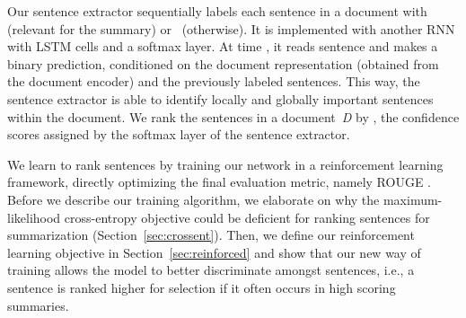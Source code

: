 \documentclass[11pt,a4paper]{article}
\newcommand\doc{{\it D }}
\begin{document}
Our sentence extractor sequentially labels each sentence in a document
with~ (relevant for the summary) or~ (otherwise). It is
implemented with another RNN with LSTM cells and a softmax layer. At
time , it reads sentence  and makes a binary prediction,
conditioned on the document representation (obtained from the document
encoder) and the previously labeled sentences. This way, the sentence
extractor is able to identify locally and globally important sentences
within the document. We rank the sentences in a document~\doc by
\mbox{}, the confidence scores assigned by
the softmax layer of the sentence extractor.








We learn to rank sentences by training our network in a reinforcement
learning framework, directly optimizing the final evaluation metric,
namely ROUGE \cite{rouge}. Before we describe our training algorithm,
we elaborate on why the maximum-likelihood cross-entropy objective
could be deficient for ranking sentences for summarization
(Section~\ref{sec:crossent}). Then, we define our reinforcement
learning objective in Section~\ref{sec:reinforced} and show that our
new way of training allows the model to better discriminate amongst
sentences, i.e., a sentence is ranked higher for selection if it often
occurs in high scoring summaries.
\end{document}
